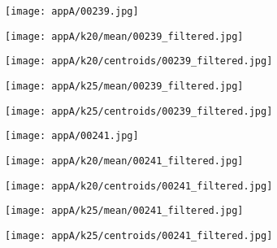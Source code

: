 \documentclass[draft,final]{vutinfth} %
\begin{document}
\begin{appendices}
\begin{figure}[h]
\centering
  \begin{subfigure}[b]{0.19\columnwidth}
    \centering
    \texttt{[image: appA/00239.jpg]}
  \end{subfigure}
  \begin{subfigure}[b]{0.19\columnwidth}
    \centering
    \texttt{[image: appA/k20/mean/00239\_filtered.jpg]}
  \end{subfigure}
  \begin{subfigure}[b]{0.19\columnwidth}
    \centering
    \texttt{[image: appA/k20/centroids/00239\_filtered.jpg]}
  \end{subfigure}
  \begin{subfigure}[b]{0.19\columnwidth}
    \centering
    \texttt{[image: appA/k25/mean/00239\_filtered.jpg]}
  \end{subfigure}
  \begin{subfigure}[b]{0.19\columnwidth}
    \centering
    \texttt{[image: appA/k25/centroids/00239\_filtered.jpg]}
  \end{subfigure}
\caption{}
\end{figure}  

\begin{figure}[h]
\centering
  \begin{subfigure}[b]{0.19\columnwidth}
    \centering
    \texttt{[image: appA/00241.jpg]}
  \end{subfigure}
  \begin{subfigure}[b]{0.19\columnwidth}
    \centering
    \texttt{[image: appA/k20/mean/00241\_filtered.jpg]}
  \end{subfigure}
  \begin{subfigure}[b]{0.19\columnwidth}
    \centering
    \texttt{[image: appA/k20/centroids/00241\_filtered.jpg]}
  \end{subfigure}
  \begin{subfigure}[b]{0.19\columnwidth}
    \centering
    \texttt{[image: appA/k25/mean/00241\_filtered.jpg]}
  \end{subfigure}
  \begin{subfigure}[b]{0.19\columnwidth}
    \centering
    \texttt{[image: appA/k25/centroids/00241\_filtered.jpg]}
  \end{subfigure}
	\caption{}
  \label{appA:241}
\end{figure}  


\end{appendices}
\end{document}
